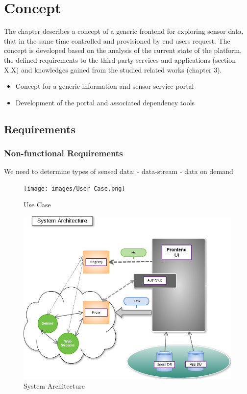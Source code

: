 \chapter{Concept}
     The chapter describes a concept of a generic frontend for exploring sensor data, 
     that in the same time controlled and provisioned by end users request. 
     The concept is developed based on the analysis of the current
     state of the platform, the defined requirements to the third-party services and applications
     (section X.X) and knowledges gained from the studied related works (chapter 3).

\begin{itemize}
     \item  Concept for a generic information and sensor service portal
     \item Development of the portal and associated dependency tools
\end{itemize}

\section{Requirements}
\subsection{Non-functional Requirements}
 \newline
 We need to determine types of sensed data:
 \newline
  - data-stream
  \newline
  - data on demand
\begin{figure}[!ht]
\centering
\texttt{[image: images/User Case.png]}   
\caption[Use Case]{Use Case}
\label{img:structure}                           
\end{figure}

\begin{figure}[!ht]
\centering
\includegraphics[scale=0.5]{images/Structure.png}   
\caption[System Architecture]{System Architecture}
\label{img:structure}                           
\end{figure}

